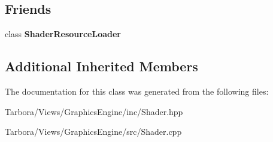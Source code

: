 \subsection*{Friends}
\begin{DoxyCompactItemize}
\item 
\mbox{\label{classTarbora_1_1Shader_af5dec6dcc9516c55d69a0f0503b73135}} 
class {\bfseries Shader\+Resource\+Loader}
\end{DoxyCompactItemize}
\subsection*{Additional Inherited Members}


The documentation for this class was generated from the following files\+:\begin{DoxyCompactItemize}
\item 
Tarbora/\+Views/\+Graphics\+Engine/inc/Shader.\+hpp\item 
Tarbora/\+Views/\+Graphics\+Engine/src/Shader.\+cpp\end{DoxyCompactItemize}

